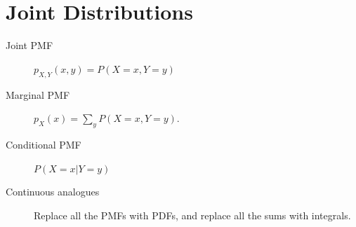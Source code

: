 \documentclass{article}
\begin{document}
 

\header

\section{Joint Distributions}

\begin{description}

\item[Joint PMF] $p_{X, Y}(x, y) = P(X=x, Y=y)$

\item[Marginal PMF] $p_{X}(x) = \sum_y P(X=x, Y=y)$.

\item[Conditional PMF] $P(X=x|Y=y)$

\item[Continuous analogues] Replace all the PMFs with PDFs, and replace all the sums with integrals.


\end{description}







\end{document}
